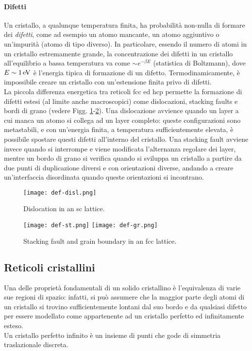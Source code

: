 \paragraph{Difetti}

Un cristallo, a qualunque temperatura finita, ha probabilità non-nulla di formare dei \textit{difetti}, come ad esempio un atomo mancante, un atomo aggiuntivo o un'impurità (atomo di tipo diverso). In particolare, essendo il numero di atomi in un cristallo estremamente grande, la concentrazione dei difetti in un cristallo all'equilibrio a bassa temperatura va come $ \sim e^{- \beta E} $ (statistica di Boltzmann), dove $ E \sim 1 \,\mathrm{eV} $ è l'energia tipica di formazione di un difetto. Termodinamicamente, è impossibile creare un cristallo con un'estensione finita privo di difetti. \\
La piccola differenza energetica tra reticoli fcc ed hcp permette la formazione di difetti estesi (al limite anche macroscopici) come dislocazioni, stacking faults e bordi di grano (vedere Figg. \ref{def-disl}-\ref{def-st-gr}). Una dislocazione avvience quando un layer a cui manca un atomo si collega ad un layer completo: queste configurazioni sono metastabili, e con un'energia finita, a temperatura sufficientemente elevata, è possibile spostare questi difetti all'interno del cristallo. Una stacking fault avviene invece quando si interrompe e viene modificata l'alternanza regolare dei layer, mentre un bordo di grano si verifica quando si sviluppa un cristallo a partire da due punti di duplicazione diversi e con orientazioni diverse, andando a creare un'interfaccia disordinata quando queste orientazioni si incontrano.

\begin{figure}[!h]
	\centering
	\texttt{[image: def-disl.png]}
	\caption{Dislocation in an sc lattice.}
	\label{def-disl}
\end{figure}
\begin{figure}[!h]
	\centering
	\texttt{[image: def-st.png]}
	\qquad \qquad
	\texttt{[image: def-gr.png]}
	\caption{Stacking fault and grain boundary in an fcc lattice.}
	\label{def-st-gr}
\end{figure}

\subsection{Reticoli cristallini}

Una delle proprietà fondamentali di un solido cristallino è l'equivalenza di varie sue regioni di spazio: infatti, si può assumere che la maggior parte degli atomi di un cristallo si trovino sufficientemente lontani dal suo bordo e da qualsiasi difetto per essere modellato come appartenente ad un cristallo perfetto ed infinitamente esteso. \\
Un cristallo perfetto infinito è un insieme di punti che gode di simmetria traslazionale discreta.

